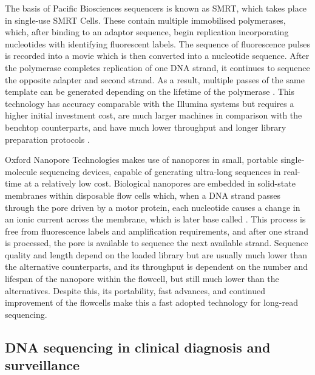 The basis of Pacific Biosciences sequencers is known as \ac{SMRT}, which takes place in single-use \ac{SMRT} Cells. 
These contain multiple immobilised polymerases, which, after binding to an adaptor sequence, begin replication incorporating nucleotides with identifying fluorescent labels. 
The sequence of fluorescence pulses is recorded into a movie which is then converted into a nucleotide sequence. 
After the polymerase completes replication of one DNA strand, it continues to sequence the opposite adapter and second strand. 
As a result, multiple passes of the same template can be generated depending on the lifetime of the polymerase \citep{hoang_long-reads-based_2022, loman_twenty_2015}. 
This technology has accuracy comparable with the Illumina systems but requires a higher initial investment cost, are much larger machines in comparison with the benchtop counterparts, and have much lower throughput and longer library preparation protocols \citep{hoang_long-reads-based_2022, wenger_accurate_2019}. 

Oxford Nanopore Technologies makes use of nanopores in small, portable single-molecule sequencing devices, capable of generating ultra-long sequences in real-time at a relatively low cost. 
Biological nanopores are embedded in solid-state membranes within disposable flow cells which, when a DNA strand passes through the pore driven by a motor protein, each nucleotide causes a change in an ionic current across the membrane, which is later base called \citep{hoang_long-reads-based_2022, loman_twenty_2015}. 
This process is free from fluorescence labels and amplification requirements, and after one strand is processed, the pore is available to sequence the next available strand. 
Sequence quality and length depend on the loaded library but are usually much lower than the alternative counterparts, and its throughput is dependent on the number and lifespan of the nanopore within the flowcell, but still much lower than the alternatives. 
Despite this, its portability, fast advances, and continued improvement of the flowcells make this a fast adopted technology for long-read sequencing.  

\subsection{DNA sequencing in clinical diagnosis and surveillance} \label{ssec:_intro_sequencing_diagnosis}

